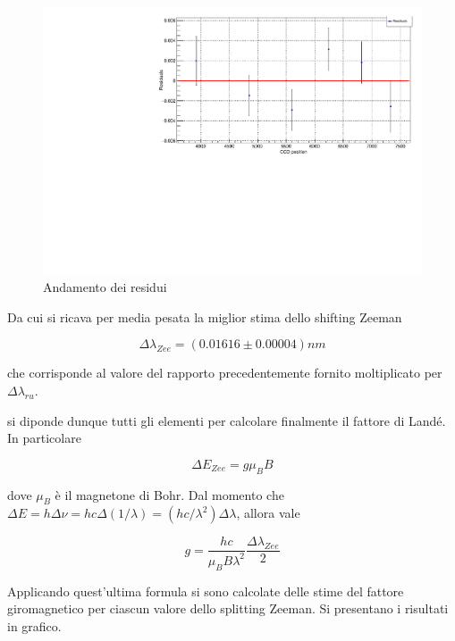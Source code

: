 \documentclass{article}
\begin{document}
	\begin{center}
		\begin{figure}[H]
			\centering
			\includegraphics[scale=0.38, angle=0]{campomax/residuals.pdf}
			\caption{Andamento dei residui}
			\label{fig:fit_dlambdazee_res}
		\end{figure}
	\end{center}

	Da cui si ricava per media pesata la miglior stima dello shifting Zeeman

	\[
		\Delta\lambda_{Zee} = (0.01616 \pm 0.00004) nm	
	\]

	che corrisponde al valore del rapporto precedentemente fornito moltiplicato per $\Delta\lambda_{ru}$.

	si diponde dunque tutti gli elementi per calcolare finalmente il fattore di Landé. In particolare

	\begin{equation}
		\Delta E_{Zee} = g \mu_B B
	\end{equation}

	dove $\mu_B$ è il magnetone di Bohr.
	Dal momento che $\Delta E = h\Delta\nu = hc\Delta(1/\lambda) = (hc / \lambda^2) \Delta\lambda$, 
	allora vale 

	\begin{equation}
		g = \frac{hc}{\mu_B B \lambda^2} \frac{\Delta\lambda_{Zee}}{2}
	\end{equation}

	Applicando quest'ultima formula si sono calcolate delle stime del fattore giromagnetico per ciascun
	valore dello splitting Zeeman. Si presentano i risultati in grafico.
\end{document}
